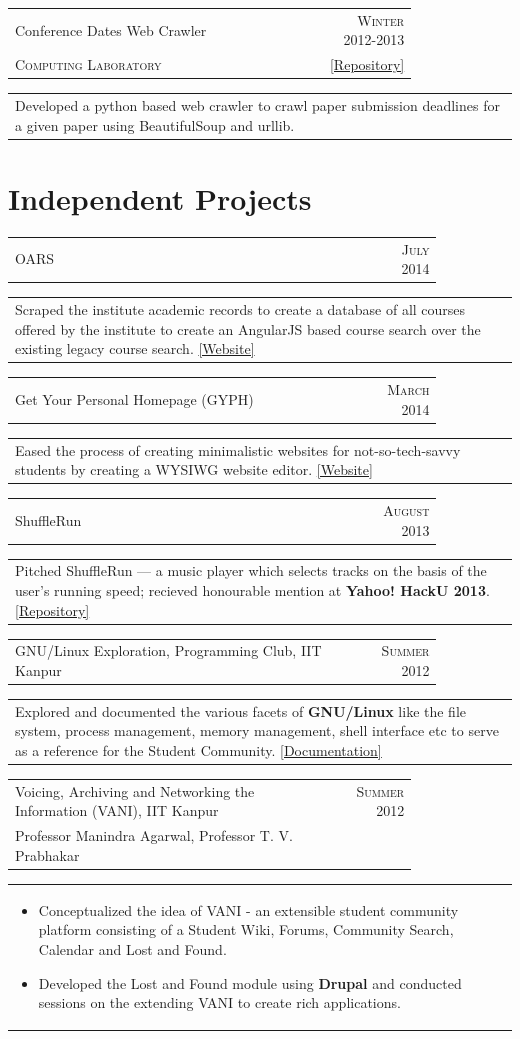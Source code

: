 \documentclass[a4paper,10pt]{article} %
\newcommand{\lproject}[4]{
    \begin{tabular}{p{0.80\linewidth}r}
        \textcolor{NavyBlue}{#2} & \multicolumn{1}{m{4cm}}{\raggedleft \textsc{#1}}\\
        #3
    \end{tabular}
    \begin{tabular}{p{\linewidth}}
    \vspace{-0.3cm}
        \footnotesize{#4}
    \end{tabular}
    \vspace{-0.5cm}
}
\newcommand{\scproject}[5]{
    \begin{tabular}{p{0.80\linewidth}r}
        \textcolor{NavyBlue}{#2} & \multicolumn{1}{m{4cm}}{\raggedleft \textsc{#1}}\\
        #3 & #4
    \end{tabular}
    \begin{tabular}{p{\linewidth}}
    \vspace{-0.3cm}
        \footnotesize{#5}
    \end{tabular}
    \vspace{-0.3cm}
}
\newcommand{\siproject}[3]{
    \begin{tabular}{p{0.85\linewidth}r}
        \textcolor{NavyBlue}{#2} & \multicolumn{1}{m{3cm}}{\raggedleft \textsc{#1}}\\
    \end{tabular}
    \begin{tabular}{p{\linewidth}}
    \vspace{-0.3cm}
        \footnotesize{#3}
    \end{tabular}
    \vspace{-0.3cm}
}
\begin{document}
\scproject
    {Winter 2012-2013}
    {Conference Dates Web Crawler}
    {\textsc{Computing Laboratory}}
    {\href{https://github.com/srijanshetty/crawler} {\footnotesize{ [Repository]}} }
    {
           Developed a python based web crawler to crawl paper submission deadlines for a given paper using BeautifulSoup and
           urllib.
    }

\section{Independent Projects}

\siproject {July 2014}
          {OARS}
          {
              Scraped the institute academic records to create a database of all courses offered by the institute to create an
              AngularJS based course search over the existing legacy course search.  \href{https://navya.github.io/oars}{[Website]}
           }

\siproject {March 2014}
          {Get Your Personal Homepage (GYPH)}
          {
               Eased the process of creating minimalistic websites for not-so-tech-savvy students by creating a WYSIWG website
               editor.  \href{http://gyph2.herokuapp.com/} {[Website]}
           }

\siproject {August 2013}
           {ShuffleRun}
           {
               Pitched ShuffleRun --- a music player which selects tracks on the basis of the user's running speed;
               recieved honourable mention at \textbf{Yahoo! HackU 2013}.  \href{https://github.com/srijanshetty/ShuffleRun} {[Repository]}
           }

\siproject {Summer 2012}
           {GNU/Linux Exploration, Programming Club, IIT Kanpur}
           {
              Explored and documented the various facets of \textbf{GNU/Linux} like the file system,
              process management, memory management, shell interface etc to serve as a reference for the
              Student Community.
              \href{https://docs.google.com/document/d/1ZHO9w36aoq3oaZBR4Um1AOmDfiTDAEgM6baQAu3icw4/edit?usp=sharing}{[Documentation]}
           }

\lproject {Summer 2012}
          {Voicing, Archiving and Networking the Information \textsc{(VANI)}, IIT Kanpur}
          {Professor Manindra Agarwal, Professor T. V. Prabhakar}
          {
              \begin{itemize}[leftmargin=0.5cm]
                  \item Conceptualized the idea of VANI - an extensible student community platform consisting
                      of a Student Wiki, Forums, Community Search, Calendar and Lost and Found.
                  \item Developed the Lost and Found module using \textbf{Drupal}
                      and conducted sessions on the extending VANI to create rich applications.
              \end{itemize}
          }
\end{document}
